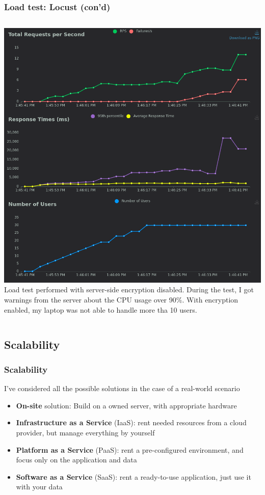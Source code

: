 \documentclass{beamer}
\begin{document}
\begin{frame}
    \frametitle{Load test: Locust (con'd)}
    
    \begin{columns}
        \vspace{-0.5em}
        \includegraphics[height=0.85\textheight]{images/ex1/30-users}
        Load test performed with server-side encryption disabled. \newline
        During the test, I got warnings from the server about the CPU usage over 90\%. \newline
        With encryption enabled, my laptop was not able to handle more tha 10 users.
    \end{columns}
 
\end{frame}

\subsection{Scalability}
\begin{frame}
    \frametitle{Scalability}
    I've considered all the possible solutions in the case of a real-world scenario
    \begin{itemize}
        \item \textbf{On-site} solution: Build on a owned server, with appropriate hardware
        \item \textbf{Infrastructure as a Service} (IaaS): rent needed resources from a cloud provider, but manage everything by yourself
        \item \textbf{Platform as a Service} (PaaS): rent a pre-configured environment, and focus only on the application and data
        \item \textbf{Software as a Service} (SaaS): rent a ready-to-use application, just use it with your data
    \end{itemize}
\end{frame}
\end{document}
